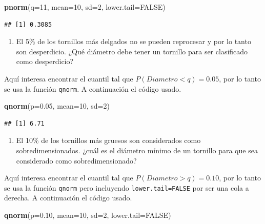 \documentclass[10pt,]{krantz}
\makeatletter
\newenvironment{Shaded}{\begin{snugshade}}{\end{snugshade}}
\newcommand{\KeywordTok}[1]{\textcolor[rgb]{0.13,0.29,0.53}{\textbf{#1}}}
\newcommand{\DataTypeTok}[1]{\textcolor[rgb]{0.13,0.29,0.53}{#1}}
\newcommand{\DecValTok}[1]{\textcolor[rgb]{0.00,0.00,0.81}{#1}}
\newcommand{\FloatTok}[1]{\textcolor[rgb]{0.00,0.00,0.81}{#1}}
\newcommand{\OtherTok}[1]{\textcolor[rgb]{0.56,0.35,0.01}{#1}}
\newcommand{\NormalTok}[1]{#1}
\providecommand{\tightlist}{%
  \setlength{\itemsep}{0pt}\setlength{\parskip}{0pt}}
\newenvironment{kframe}{%
\medskip{}
\setlength{\fboxsep}{.8em}
 \def\at@end@of@kframe{}%
 \ifinner\ifhmode%
  \def\at@end@of@kframe{\end{minipage}}%
  \begin{minipage}{\columnwidth}%
 \fi\fi%
 \def\FrameCommand##1{\hskip\@totalleftmargin \hskip-\fboxsep
 \colorbox{shadecolor}{##1}\hskip-\fboxsep
     \hskip-\linewidth \hskip-\@totalleftmargin \hskip\columnwidth}%
 \MakeFramed {\advance\hsize-\width
   \@totalleftmargin\z@ \linewidth\hsize
   \@setminipage}}%
 {\par\unskip\endMakeFramed%
 \at@end@of@kframe}
\renewenvironment{Shaded}{\begin{kframe}}{\end{kframe}}
\makeatother
\begin{document}
\begin{Shaded}
\begin{Highlighting}[]
\KeywordTok{pnorm}\NormalTok{(}\DataTypeTok{q=}\DecValTok{11}\NormalTok{, }\DataTypeTok{mean=}\DecValTok{10}\NormalTok{, }\DataTypeTok{sd=}\DecValTok{2}\NormalTok{, }\DataTypeTok{lower.tail=}\OtherTok{FALSE}\NormalTok{)}
\end{Highlighting}
\end{Shaded}

\begin{verbatim}
## [1] 0.3085
\end{verbatim}

\begin{enumerate}
\def\labelenumi{\arabic{enumi})}
\setcounter{enumi}{2}
\tightlist
\item
  El 5\% de los tornillos más delgados no se pueden reprocesar y por lo
  tanto son desperdicio. ¿Qué diámetro debe tener un tornillo para ser
  clasificado como desperdicio?
\end{enumerate}

Aquí interesa encontrar el cuantil tal que \(P(Diametro<q)=0.05\), por
lo tanto se usa la función \texttt{qnorm}. A continuación el código
usado.

\begin{Shaded}
\begin{Highlighting}[]
\KeywordTok{qnorm}\NormalTok{(}\DataTypeTok{p=}\FloatTok{0.05}\NormalTok{, }\DataTypeTok{mean=}\DecValTok{10}\NormalTok{, }\DataTypeTok{sd=}\DecValTok{2}\NormalTok{)}
\end{Highlighting}
\end{Shaded}

\begin{verbatim}
## [1] 6.71
\end{verbatim}

\begin{enumerate}
\def\labelenumi{\arabic{enumi})}
\setcounter{enumi}{3}
\tightlist
\item
  El 10\% de los tornillos más gruesos son considerados como
  sobredimensionados. ¿cuál es el diámetro mínimo de un tornillo para
  que sea considerado como sobredimensionado?
\end{enumerate}

Aquí interesa encontrar el cuantil tal que \(P(Diametro>q)=0.10\), por
lo tanto se usa la función \texttt{qnorm} pero incluyendo
\texttt{lower.tail=FALSE} por ser una cola a derecha. A continuación el
código usado.

\begin{Shaded}
\begin{Highlighting}[]
\KeywordTok{qnorm}\NormalTok{(}\DataTypeTok{p=}\FloatTok{0.10}\NormalTok{, }\DataTypeTok{mean=}\DecValTok{10}\NormalTok{, }\DataTypeTok{sd=}\DecValTok{2}\NormalTok{, }\DataTypeTok{lower.tail=}\OtherTok{FALSE}\NormalTok{)}
\end{Highlighting}
\end{Shaded}
\end{document}
